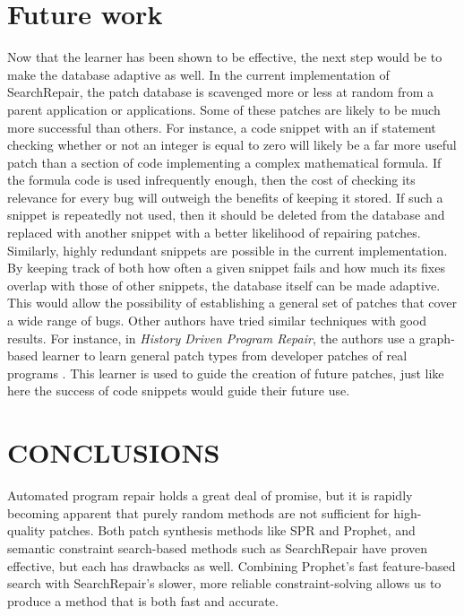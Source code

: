 \documentclass[conference]{IEEEtran}
\begin{document}
\section{Future work}

Now that the learner has been shown to be effective, the next step would be to make the database adaptive as well. 
In the current implementation of SearchRepair, the patch database is scavenged more or less at random from a parent application or applications. 
Some of these patches are likely to be much more successful than others. 
For instance, a code snippet with an if statement checking whether or not an integer is equal to zero will likely be a far more useful patch than a section of code implementing a complex mathematical formula. 
If the formula code is used infrequently enough, then the cost of checking its relevance for every bug will outweigh the benefits of keeping it stored. 
If such a snippet is repeatedly not used, then it should be deleted from the database and replaced with another snippet with a better likelihood of repairing patches. 
Similarly, highly redundant snippets are possible in the current implementation. 
By keeping track of both how often a given snippet fails and how much its fixes overlap with those of other snippets, the database itself can be made adaptive. 
This would allow the possibility of establishing a general set of patches that cover a wide range of bugs. 
Other authors have tried similar techniques with good results. 
For instance, in \textit{History Driven Program Repair}, the authors use a graph-based learner to learn general patch types from developer patches of real programs \cite{hdrepair}. 
This learner is used to guide the creation of future patches, just like here the success of code snippets would guide their future use. 


\section{CONCLUSIONS}

Automated program repair holds a great deal of promise, but it is rapidly becoming apparent that purely random methods are not sufficient for high-quality patches. 
Both patch synthesis methods like SPR and Prophet, and semantic constraint search-based methods such as SearchRepair have proven effective, but each has drawbacks as well. 
Combining Prophet's fast feature-based search with SearchRepair's slower, more reliable constraint-solving allows us to produce a method that is both fast and accurate. 
\end{document}
